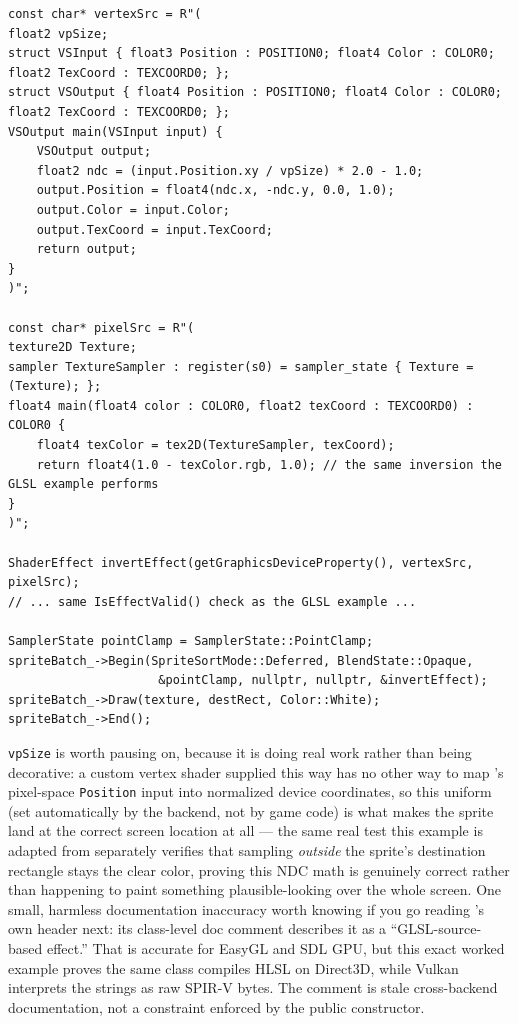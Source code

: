 \begin{lstlisting}
const char* vertexSrc = R"(
float2 vpSize;
struct VSInput { float3 Position : POSITION0; float4 Color : COLOR0; float2 TexCoord : TEXCOORD0; };
struct VSOutput { float4 Position : POSITION0; float4 Color : COLOR0; float2 TexCoord : TEXCOORD0; };
VSOutput main(VSInput input) {
    VSOutput output;
    float2 ndc = (input.Position.xy / vpSize) * 2.0 - 1.0;
    output.Position = float4(ndc.x, -ndc.y, 0.0, 1.0);
    output.Color = input.Color;
    output.TexCoord = input.TexCoord;
    return output;
}
)";

const char* pixelSrc = R"(
texture2D Texture;
sampler TextureSampler : register(s0) = sampler_state { Texture = (Texture); };
float4 main(float4 color : COLOR0, float2 texCoord : TEXCOORD0) : COLOR0 {
    float4 texColor = tex2D(TextureSampler, texCoord);
    return float4(1.0 - texColor.rgb, 1.0); // the same inversion the GLSL example performs
}
)";

ShaderEffect invertEffect(getGraphicsDeviceProperty(), vertexSrc, pixelSrc);
// ... same IsEffectValid() check as the GLSL example ...

SamplerState pointClamp = SamplerState::PointClamp;
spriteBatch_->Begin(SpriteSortMode::Deferred, BlendState::Opaque,
                     &pointClamp, nullptr, nullptr, &invertEffect);
spriteBatch_->Draw(texture, destRect, Color::White);
spriteBatch_->End();
\end{lstlisting}

\texttt{vpSize} is worth pausing on, because it is doing real work rather than being decorative:
a custom vertex shader supplied this way has no other way to map 's
pixel-space \texttt{Position} input into normalized device coordinates, so this uniform (set
automatically by the backend, not by game code) is what makes the sprite land at the correct
screen location at all --- the same real test this example is adapted from separately verifies
that sampling \emph{outside} the sprite's destination rectangle stays the clear color, proving
this NDC math is genuinely correct rather than happening to paint something plausible-looking
over the whole screen. One small, harmless documentation inaccuracy worth knowing if you go
reading 's own header next: its class-level doc comment describes it as
a ``GLSL-source-based effect.'' That is accurate for EasyGL and SDL GPU, but this exact worked
example proves the same class compiles HLSL on Direct3D, while Vulkan interprets the strings as
raw SPIR-V bytes. The comment is stale cross-backend documentation, not a constraint enforced
by the public constructor.

